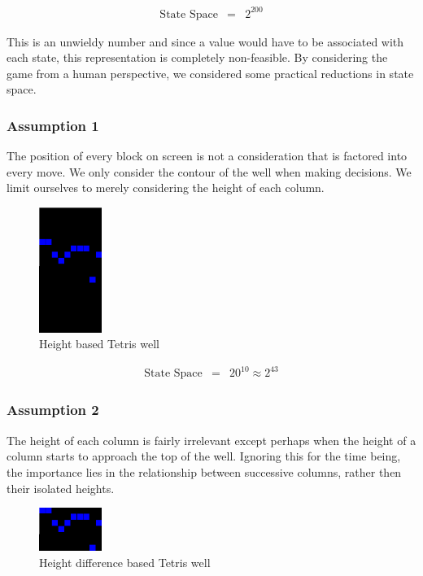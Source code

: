 \documentclass[a4paper,twocolumn]{article}
\begin{document}
\begin{eqnarray}
\textrm{State Space} & = & 2^{200} 
\end{eqnarray}

This is an unwieldy number and since a value would have to be associated with each state, this representation is completely non-feasible. By considering the game from a human perspective, we considered some practical reductions in state space. 

\subsubsection*{Assumption 1}

The position of every block on screen is not a consideration that is factored into every move. We only consider the contour of the well when making decisions. We limit ourselves to merely considering the height of each column.

\begin{figure}[h]
\centering
\includegraphics[width=0.8in]{heightwell.png}
\caption{Height based Tetris well}
\label{fig:heightwell}
\end{figure}

\begin{eqnarray}
\textrm{State Space} & = & 20^{10} \approx 2^{43}
\end{eqnarray}

\subsubsection*{Assumption 2}

The height of each column is fairly irrelevant except perhaps when the height of a column starts to approach the top of the well. Ignoring this for the time being, the importance lies in the relationship between successive columns, rather then their isolated heights.

\begin{figure}[h]
\centering
\includegraphics[width=0.8in]{diffheightwell.png}
\caption{Height difference based Tetris well}
\label{fig:diffheightwell}
\end{figure}
\end{document}
